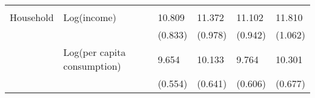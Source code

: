 \begin{tabular}{llllll}
           &                             &                                      &                                      &                                      &                                      \\
Household  & Log(income)                 & 10.809      & 11.372      & 11.102      & 11.810      \\
           &                             & (0.833) & (0.978) & (0.942) & (1.062) \\
           & Log(per capita consumption) & 9.654           & 10.133           & 9.764           & 10.301           \\ 
           &                             & (0.554)      & (0.641)      & (0.606)      & (0.677)      \\ \hline
\end{tabular}%

